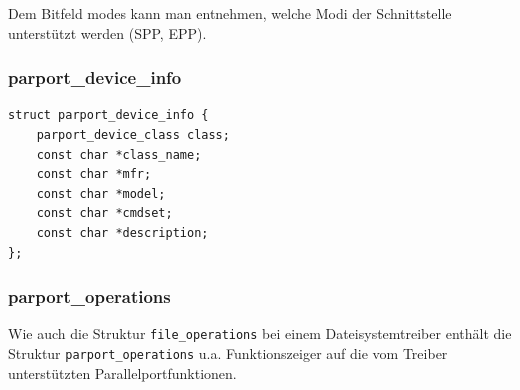 \documentclass[a4paper,11pt]{article}
\begin{document}
Dem Bitfeld modes kann man entnehmen, welche Modi der Schnittstelle unterstützt werden (SPP, EPP).

\subsubsection{parport\_device\_info}

\begin{verbatim}
struct parport_device_info {
    parport_device_class class;
    const char *class_name;
    const char *mfr;
    const char *model;
    const char *cmdset;
    const char *description;
};\end{verbatim} 

\subsubsection{parport\_operations}

Wie auch die Struktur \verb|file_operations| bei einem Dateisystemtreiber enthält die 
Struktur \verb|parport_operations| u.a. Funktionszeiger auf die vom Treiber unterstützten
Parallelportfunktionen.
\end{document}
